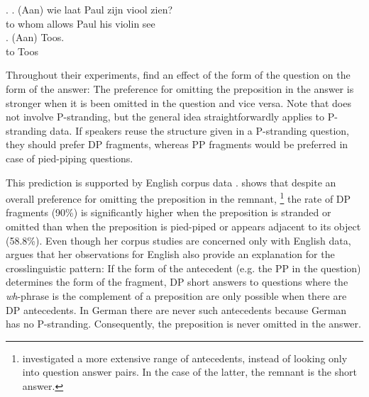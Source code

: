 \ex. \ag. (Aan) wie laat Paul zijn viool zien?\\
      to  whom allows Paul his violin see\\
      \bg. (Aan) Toos.\\
      to Toos\\

Throughout their experiments, \citet{levelt.kelter1982} find an effect of the form of the question on the form of the answer: The preference for omitting the preposition in the answer is stronger when it is been omitted in the question and vice versa. Note that \Last does not involve P-stranding, but the general idea straightforwardly applies to P-stranding data. If speakers reuse the structure given in a P-stranding question, they should prefer DP fragments, whereas PP fragments would be preferred in case of pied-piping questions. 

This prediction is supported by English corpus data \citep{nykiel2014, nykiel2017}. \citet{nykiel2017} shows that despite an overall preference for omitting the preposition in the remnant,%
%
\footnote{\citet{nykiel2017} investigated a more extensive range of antecedents, instead of looking only into question answer pairs. In the case of the latter, the remnant is the short answer.}\afterfn%
%
the rate of DP fragments (90\%) is significantly higher when the preposition is stranded or omitted than when the preposition is pied-piped or appears adjacent to its object (58.8\%). Even though her corpus studies are concerned only with English data, \citet[41-42]{nykiel2017} argues that her observations for English also provide an explanation for the crosslinguistic pattern: If the form of the antecedent (e.g. the PP in the question) determines the form of the fragment, DP short answers to questions where the \textit{wh}-phrase is the complement of a preposition are only possible when there are DP antecedents. In German there are never such antecedents because German has no P-stranding. Consequently, the preposition is never omitted in the answer.


